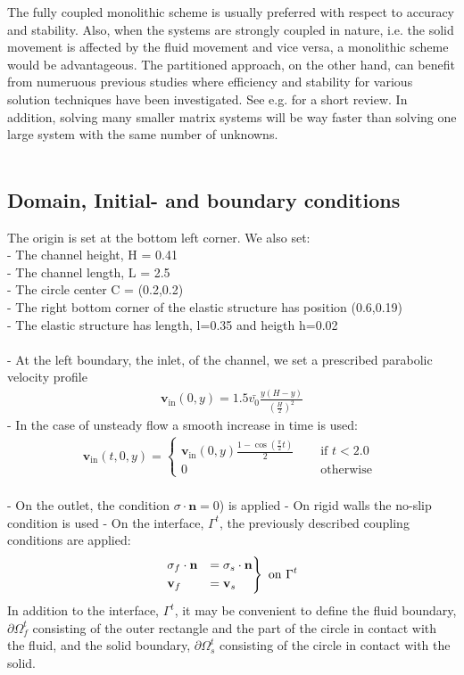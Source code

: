 The fully coupled monolithic scheme is usually preferred with respect to accuracy and stability. Also, when the systems are strongly coupled in nature, i.e. the solid movement is affected by the fluid movement and vice versa, a monolithic scheme would be advantageous. The partitioned approach, on the other hand, can benefit from numeruous previous studies where efficiency and stability for various solution techniques have been investigated. See e.g. \cite{Tang14} for a short review. In addition, solving many smaller matrix systems will be way faster than solving one large system with the same number of unknowns.
\\
\\
\subsection{Domain, Initial- and boundary conditions}
The origin is set at the bottom left corner. We also set:
\\ - The channel height, H = 0.41
\\ - The channel length, L = 2.5
\\ - The circle center C = (0.2,0.2)
\\ - The right bottom corner of the elastic structure has position (0.6,0.19) 
\\ - The elastic structure has length, l=0.35 and heigth h=0.02
\\
\\
- At the left boundary, the inlet, of the channel, we set a prescribed parabolic velocity profile
\begin{align}
\mathbf{v}_{\text{in}}(0,y) = 1.5\bar{v_0}\frac{y(H-y)}{(\frac{H}{2})^2}
\end{align}
- In the case of unsteady flow a smooth increase in time is used:
\begin{align}
 \mathbf{v}_{\text{in}}(t,0,y)= \begin{cases}
				\mathbf{v}_{\text{in}}(0,y)\frac{1-\cos(\frac{\pi}{2}t)}{2} & \quad \text{ if } t<2.0 \\
				0 & \quad  \text{ otherwise }
		 		\end{cases}
\end{align}
\\
- On the outlet, the condition $\sigma \cdot \mathbf{n} = 0$) is applied
- On rigid walls the no-slip condition is used
- On the interface, $\Gamma^t$, the previously described coupling conditions are applied:
\begin{align}
\begin{rcases}
\sigma_f \cdot \mathbf{n} & =  \sigma_s \cdot \mathbf{n} \\
\mathbf{v}_f & = \mathbf{v}_s
\end{rcases}
\text{ on } \Gamma^t
\end{align}
In addition to the interface, $\Gamma^t$, it may be convenient to define the fluid boundary, $\partial \Omega_f^t$ consisting of the outer rectangle and the part of the circle in contact with the fluid, and the solid boundary, $\partial \Omega_s^t$ consisting of the circle in contact with the solid.
